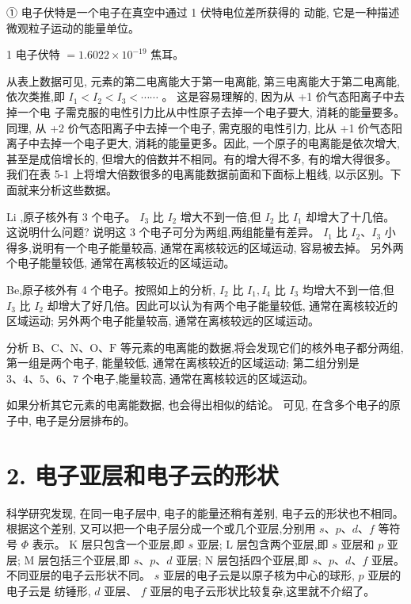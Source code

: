 \documentclass[10pt]{article}
\begin{document}
① 电子伏特是一个电子在真空中通过 1 伏特电位差所获得的 动能, 它是一种描述微观粒子运动的能量单位。

1 电子伏特 \(= {1.6022} \times {10}^{-{19}}\) 焦耳。

从表上数据可见, 元素的第二电离能大于第一电离能, 第三电离能大于第二电离能,依次类推,即 \({I}_{1} < {I}_{2} < {I}_{3} < \cdots \cdots\) 。 这是容易理解的, 因为从 +1 价气态阳离子中去掉一个电 子需克服的电性引力比从中性原子去掉一个电子要大, 消耗的能量要多。同理, 从 +2 价气态阳离子中去掉一个电子, 需克服的电性引力, 比从 +1 价气态阳离子中去掉一个电子更大, 消耗的能量更多。因此, 一个原子的电离能是依次增大, 甚至是成倍增长的, 但增大的倍数并不相同。有的增大得不多, 有的增大得很多。我们在表 5-1 上将增大倍数很多的电离能数据前面和下面标上粗线, 以示区别。下面就来分析这些数据。

\(\mathrm{{Li}}\) ,原子核外有 3 个电子。 \({I}_{3}\) 比 \({I}_{2}\) 增大不到一倍,但 \({I}_{2}\) 比 \({I}_{1}\) 却增大了十几倍。这说明什么问题? 说明这 3 个电子可分为两组,两组能量有差异。 \({I}_{1}\) 比 \({I}_{2}\text{、}{I}_{3}\) 小得多,说明有一个电子能量较高, 通常在离核较远的区域运动, 容易被去掉。 另外两个电子能量较低, 通常在离核较近的区域运动。

Be,原子核外有 4 个电子。按照如上的分析, \({I}_{2}\) 比 \({I}_{1},{I}_{4}\) 比 \({I}_{3}\) 均增大不到一倍,但 \({I}_{3}\) 比 \({I}_{2}\) 却增大了好几倍。因此可以认为有两个电子能量较低, 通常在离核较近的区域运动; 另外两个电子能量较高, 通常在离核较远的区域运动。

分析 \(\mathrm{B}\text{、}\mathrm{C}\text{、}\mathrm{N}\text{、}\mathrm{O}\text{、}\mathrm{F}\) 等元素的电离能的数据,将会发现它们的核外电子都分两组, 第一组是两个电子, 能量较低, 通常在离核较近的区域运动; 第二组分别是 \(3\text{、}4\text{、}5\text{、}6\text{、}7\) 个电子,能量较高, 通常在离核较远的区域运动。

如果分析其它元素的电离能数据, 也会得出相似的结论。 可见, 在含多个电子的原子中, 电子是分层排布的。

\section*{2. 电子亚层和电子云的形状}

科学研究发现, 在同一电子层中, 电子的能量还稍有差别, 电子云的形状也不相同。根据这个差别, 又可以把一个电子层分成一个或几个亚层,分别用 \(s\text{、}p\text{、}d\text{、}f\) 等符号 \(\Phi\) 表示。 \(\mathrm{K}\) 层只包含一个亚层,即 \(s\) 亚层; \(\mathrm{L}\) 层包含两个亚层,即 \(s\) 亚层和 \(p\) 亚层; \(\mathrm{M}\) 层包括三个亚层,即 \(s\text{、}p\text{、}d\) 亚层; \(\mathrm{N}\) 层包括四个亚层,即 \(s\text{、}p\text{、}d\text{、}f\) 亚层。不同亚层的电子云形状不同。 \(s\) 亚层的电子云是以原子核为中心的球形, \(p\) 亚层的电子云是 纺锤形, \(d\) 亚层、 \(f\) 亚层的电子云形状比较复杂,这里就不介绍了。
\end{document}
